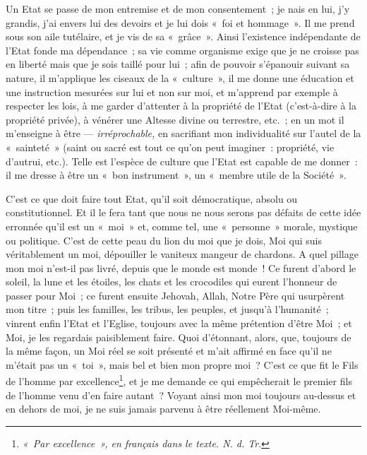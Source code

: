 \documentclass[french,twoside]{book} %
\begin{document}
Un Etat se passe de mon entremise et de mon consentement ; je nais en lui, j’y grandis, j’ai envers lui des devoirs et je lui dois « foi et hommage ». Il me prend sous son aile tutélaire, et je vis de sa « grâce ». Ainsi l’existence indépendante de l’Etat fonde ma dépendance ; sa vie comme organisme exige que je ne croisse pas en liberté mais que je sois taillé pour lui ; afin de pouvoir s’épanouir suivant sa nature, il m’applique les ciseaux de la « culture », il me donne une éducation et une instruction mesurées sur lui et non sur moi, et m’apprend par exemple à respecter les lois, à me garder d’attenter à la propriété de l’Etat (c’est-à-dire à la propriété privée), à vénérer une Altesse divine ou terrestre, etc. ; en un mot il m’enseigne à être — \emph{irréprochable,} en sacrifiant mon individualité sur l’autel de la « sainteté » (saint ou sacré est tout ce qu’on peut  imaginer : propriété, vie d’autrui, etc.). Telle est l’espèce de culture que l’Etat est capable de me donner : il me dresse à être un « bon instrument », un « membre utile de la Société ».\par
C’est ce que doit faire tout Etat, qu’il soit démocratique, absolu ou constitutionnel. Et il le fera tant que nous ne nous serons pas défaits de cette idée erronnée qu’il est un « moi » et, comme tel, une « personne » morale, mystique ou politique. C’est de cette peau du lion du moi que je dois, Moi qui suis véritablement un moi, dépouiller le vaniteux mangeur de chardons. A quel pillage mon moi n’est-il pas livré, depuis que le monde est monde ! Ce furent d’abord le soleil, la lune et les étoiles, les chats et les crocodiles qui eurent l’honneur de passer pour Moi ; ce furent ensuite Jehovah, Allah, Notre Père qui usurpèrent mon titre ; puis les familles, les tribus, les peuples, et jusqu’à l’humanité ; vinrent enfin l’Etat et l’Eglise, toujours avec la même prétention d’être Moi ; et Moi, je les regardais paisiblement faire. Quoi d’étonnant, alors, que, toujours de la même façon, un Moi réel se soit présenté et m’ait affirmé en face qu’il ne m’était pas un « toi », mais bel et bien mon propre moi ? C’est ce que fit le Fils de l’homme par excellence\footnote{ \noindent \emph{« Par excellence », en français dans le texte. N. d. Tr}.
 }, et je me demande ce qui empêcherait le premier fils de l’homme venu d’en faire autant ? Voyant ainsi mon moi toujours au-dessus et en dehors de moi, je ne suis jamais parvenu à être réellement Moi-même.\par
\end{document}
